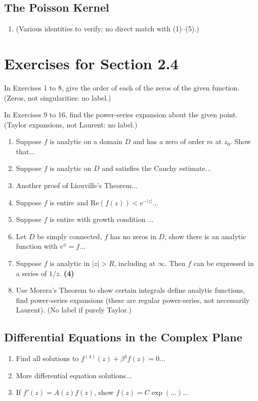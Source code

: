 \documentclass[12pt]{article}
\theoremstyle{definition} %
\theoremstyle{plain} %
\begin{document}
\subsection*{The Poisson Kernel}
\begin{enumerate}
    \item[\quad] (Various identities to verify; no direct match with (1)--(5).)
\end{enumerate}

\section*{Exercises for Section 2.4}

In Exercises 1 to 8, give the order of each of the zeros of the given function. (Zeros, not singularities: no label.)

In Exercises 9 to 16, find the power-series expansion about the given point. (Taylor expansions, not Laurent: no label.)

\begin{enumerate}
    \item Suppose $f$ is analytic on a domain $D$ and has a zero of order $m$ at $z_0$. Show that...
    \item Suppose $f$ is analytic on $D$ and satisfies the Cauchy estimate...
    \item Another proof of Liouville’s Theorem...
    \item Suppose $f$ is entire and $\mathrm{Re}(f(z)) < e^{-|z|}$...
    \item Suppose $f$ is entire with growth condition $\dots$ 
    \item Let $D$ be simply connected, $f$ has no zeros in $D$, show there is an analytic function with $e^\phi=f$...
    \item Suppose $f$ is analytic in $|z|>R$, including at $\infty$. Then $f$ can be expressed in a series of $1/z$. \quad \textbf{(4)}
    \item Use Morera’s Theorem to show certain integrals define analytic functions, find power-series expansions (these are regular power-series, not necessarily Laurent). (No label if purely Taylor.)
\end{enumerate}

\subsection*{Differential Equations in the Complex Plane}
\begin{enumerate}
    \item Find all solutions to $f^{(4)}(z)+\beta^4 f(z)=0$...
    \item More differential equation solutions...
    \item If $f'(z)=A(z)f(z)$, show $f(z)=C\exp(\dots)$...
\end{enumerate}
\end{document}
